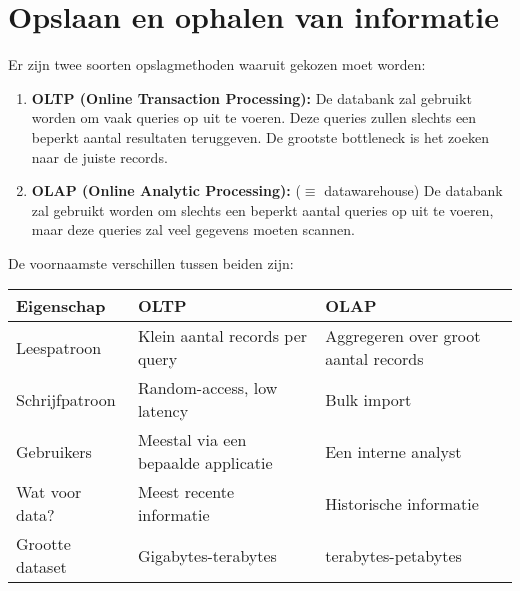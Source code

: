 	\chapter{Opslaan en ophalen van informatie}
	Er zijn twee soorten opslagmethoden waaruit gekozen moet worden:
	\begin{enumerate}
		\item  \textbf{OLTP (Online Transaction Processing):} De databank zal gebruikt worden om vaak queries op uit te voeren. Deze queries zullen slechts een beperkt aantal resultaten teruggeven. De grootste bottleneck is het zoeken naar de juiste records.
		\item  \textbf{OLAP (Online Analytic Processing):} ($\equiv$ datawarehouse) De databank zal gebruikt worden om slechts een beperkt aantal queries op uit te voeren, maar deze queries zal veel gegevens moeten scannen.
	\end{enumerate}
	De voornaamste verschillen tussen beiden zijn:
	\begin{table}[ht]
		\begin{tabular}{l | l l}
			Eigenschap & OLTP & OLAP \\
			\hline
			Leespatroon & Klein aantal records per query & Aggregeren over groot aantal records \\
			Schrijfpatroon & Random-access, low latency & Bulk import \\
			Gebruikers & Meestal via een bepaalde applicatie & Een interne analyst \\
			Wat voor data? & Meest recente informatie & Historische informatie \\
			Grootte dataset & Gigabytes-terabytes & terabytes-petabytes 
		\end{tabular}
	\end{table}

